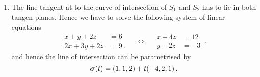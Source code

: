 \begin{solution}
\begin{enumerate}
\item
The line tangent at to the curve of intersection of $S_1$ and $S_2$ has to lie in both tangen planes. Hence we have to solve the following system of linear equations
\[
\begin{aligned}
x + y + 2z &= 6 \\
2x + 3y + 2z &= 9\,.
\end{aligned}
\quad\Leftrightarrow\quad
\begin{aligned}
x + 4z &= 12 \\
y - 2z &= -3
\end{aligned}\,.
\]
and hence the line of intersection can be parametrised by
\[
\bm{\mathrm{\sigma}}(t) = (1, 1, 2) + t ( -4, 2, 1)\,.
\]
\end{enumerate}
\end{solution}


